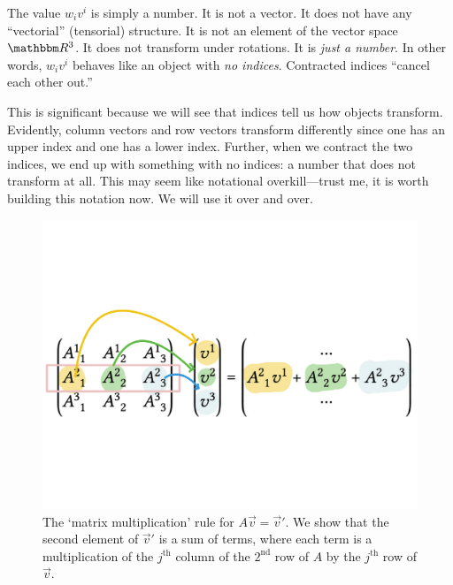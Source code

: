 \documentclass[12pt]{article}
\begin{document}
The value $w_iv^i$ is simply a number. It is not a vector. It does not have any ``vectorial'' (tensorial) structure. It is not an element of the vector space $\RR ^3$. It does not transform under rotations. It is \emph{just a number}. In other words, $w_iv^i$ behaves like an object with \emph{no indices}. Contracted indices ``cancel each other out.''

This is significant because we will see that indices tell us how objects transform. Evidently, column vectors and row vectors transform differently since one has an upper index and one has a lower index. Further, when we contract the two indices, we end up with something with no indices: a number that does not transform at all. This may seem like notational overkill---trust me, it is worth building this notation now. We will use it over and over.

\begin{figure}[tb]
    \centering
    \includegraphics[width=.5\textwidth]{figures/matrixmultiplication.pdf}
    \caption{The `matrix multiplication' rule for $A\vec{v} = \vec{v}'$. We show that the second element of $\vec{v}'$ is a sum of terms, where each term is a multiplication of the $j^\text{th}$ column of the $2^\text{nd}$ row of $A$ by the $j^\text{th}$ row of $\vec{v}$.}
    \label{fig:matrix:col:mult}
\end{figure}
\end{document}
